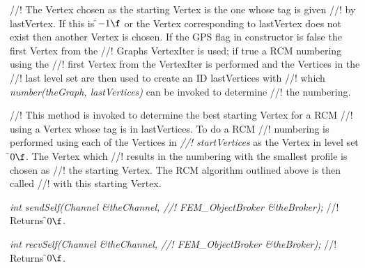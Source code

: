 //! The Vertex chosen as the starting Vertex is the one whose tag is given
//! by \p lastVertex. If this is \f$-1\f$ or the Vertex corresponding to
\p lastVertex does not exist then another Vertex is chosen. If the
\p GPS flag in constructor is \p false the first Vertex from the
//! Graphs VertexIter is used; if \p true a RCM numbering using the
//! first Vertex from the VertexIter is performed and the Vertices in the
//! last level set are then used to create an ID \p lastVertices with
//! which {\em number(theGraph, lastVertices)} can be invoked to determine
//! the numbering.


//! This method is invoked to determine the best starting Vertex for a RCM
//! using a Vertex whose tag is in \p lastVertices. To do a RCM
//! numbering is performed using each of the Vertices in {\em
//! startVertices} as the Vertex in level set \f$0\f$. The Vertex which
//! results in the numbering with the smallest profile is chosen as 
//! the starting Vertex. The RCM algorithm outlined above is then called
//! with this starting Vertex.

{\em int sendSelf(Channel \&theChannel,
//! FEM\_ObjectBroker \&theBroker);}
//! Returns \f$0\f$.

{\em int recvSelf(Channel \&theChannel,
//! FEM\_ObjectBroker \&theBroker); }
//! Returns \f$0\f$.

